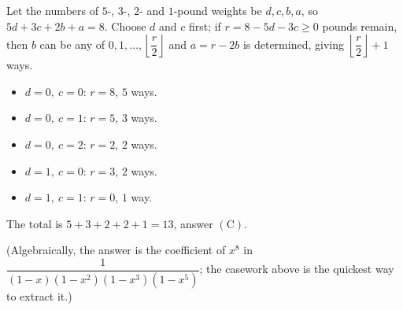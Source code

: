 Let the numbers of $5$-, $3$-, $2$- and $1$-pound weights be $d,c,b,a$, so $5d+3c+2b+a=8$. Choose $d$ and $c$ first; if $r=8-5d-3c\ge0$ pounds remain, then $b$ can be any of $0,1,\ldots,\left\lfloor\dfrac {r}{2}\right\rfloor$ and $a=r-2b$ is determined, giving $\left\lfloor\dfrac {r}{2}\right\rfloor+1$ ways.
\begin{itemize}
\item $d=0,\ c=0$: $r=8$, $5$ ways.
\item $d=0,\ c=1$: $r=5$, $3$ ways.
\item $d=0,\ c=2$: $r=2$, $2$ ways.
\item $d=1,\ c=0$: $r=3$, $2$ ways.
\item $d=1,\ c=1$: $r=0$, $1$ way.
\end{itemize}
The total is $5+3+2+2+1=13$, answer $\boxed{\mathrm{(C)}}$.

(Algebraically, the answer is the coefficient of $x^8$ in $\dfrac{1}{(1-x)\left(1-x^2\right)\left(1-x^3\right)\left(1-x^5\right)}$; the casework above is the quickest way to extract it.)
